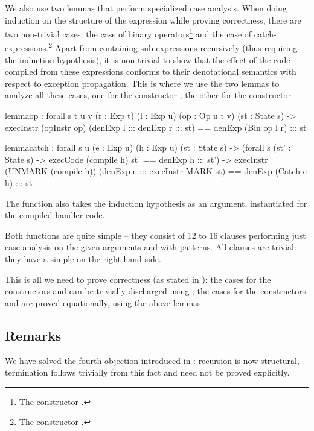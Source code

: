 \noindent We also use two lemmas that perform specialized case analysis. When
doing induction on the structure of the expression while proving correctness,
there are two non-trivial cases: the case of binary operators\footnote{The
constructor .} and the case of catch-expressions.\footnote{The
constructor .} Apart from containing sub-expressions recursively
(thus requiring the induction hypothesis), it is non-trivial to show that the
effect of the code compiled from these expressions conforms to their
denotational semantics with respect to exception propagation.  This is where we
use the two lemmas to analyze all these cases, one for the constructor
, the other for the constructor .

\begin{code}
  lemma\-op : forall {s t u v} (r : Exp t) (l : Exp u) (op : Op u t v) (st : State s)
    -> execInstr (opInstr op) (denExp l ::: denExp r ::: st)
      == denExp (Bin op l r) ::: st
\end{code}

\begin{code}
  lemma\-catch : forall {s u} (e : Exp u) (h : Exp u) (st : State s)
    -> (forall {s} (st' : State s) -> execCode (compile h) st' == denExp h ::: st')
    -> execInstr (UNMARK (compile h)) (denExp e ::: execInstr MARK st)
      == denExp (Catch e h) ::: st
\end{code}

The function  also takes the induction hypothesis as an
argument, instantiated for the compiled handler code.

Both functions are quite simple -- they consist of 12 to 16 clauses
performing just case analysis on the given arguments and with-patterns.
All clauses are trivial: they have a simple  on the right-hand side.

This is all we need to prove correctness (as stated in
): the cases for the constructors  and
 can be trivially discharged using ; the cases for the
constructors  and  are proved equationally, using the
above lemmas.

\subsection{Remarks}

We have solved the fourth objection introduced in
: recursion is now structural, termination
follows trivially from this fact and need not be proved explicitly.

